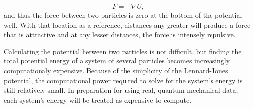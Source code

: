 \begin{equation} \label{eq:forceEq}
F = -\nabla U,
\end{equation}
and thus the force between two particles is zero at the bottom of the potential well. With that location as a reference, distances any greater will produce a force that is attractive and at any lesser distances, the force is intensely repulsive.
\par Calculating the potential between two particles is not difficult, but finding the total potential energy of a system of several particles becomes increasingly computationaly expensive. Because of the simplicity of the Lennard-Jones potential, the computational power required to solve for the system's energy is still relatively small. In preparation for using real, quantum-mechanical data, each system's energy will be treated as expensive to compute. 



